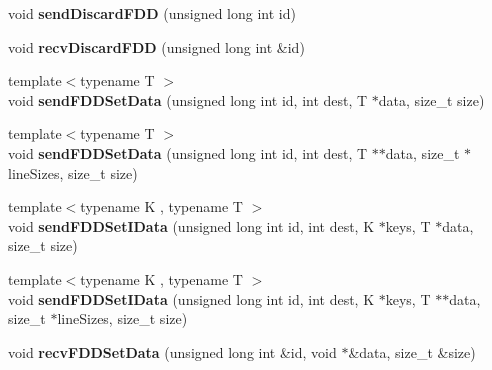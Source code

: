 \begin{DoxyCompactItemize}
\item 
\hypertarget{classfaster_1_1fastComm_a7e1ca7788c4310cb84640812fa50a012}{}void {\bfseries send\+Discard\+F\+D\+D} (unsigned long int id)\label{classfaster_1_1fastComm_a7e1ca7788c4310cb84640812fa50a012}

\item 
\hypertarget{classfaster_1_1fastComm_aaa0a11dcde70a8dcf39b0773c9c15d43}{}void {\bfseries recv\+Discard\+F\+D\+D} (unsigned long int \&id)\label{classfaster_1_1fastComm_aaa0a11dcde70a8dcf39b0773c9c15d43}

\item 
\hypertarget{classfaster_1_1fastComm_acc7534571a62d6df7c4f7a13d69b9e41}{}{\footnotesize template$<$typename T $>$ }\\void {\bfseries send\+F\+D\+D\+Set\+Data} (unsigned long int id, int dest, T $\ast$data, size\+\_\+t size)\label{classfaster_1_1fastComm_acc7534571a62d6df7c4f7a13d69b9e41}

\item 
\hypertarget{classfaster_1_1fastComm_a71e3ddff08c78a0a0e4cfb03f3ebf63c}{}{\footnotesize template$<$typename T $>$ }\\void {\bfseries send\+F\+D\+D\+Set\+Data} (unsigned long int id, int dest, T $\ast$$\ast$data, size\+\_\+t $\ast$line\+Sizes, size\+\_\+t size)\label{classfaster_1_1fastComm_a71e3ddff08c78a0a0e4cfb03f3ebf63c}

\item 
\hypertarget{classfaster_1_1fastComm_aeaf4e75975319f16c3c9544b8ab9309e}{}{\footnotesize template$<$typename K , typename T $>$ }\\void {\bfseries send\+F\+D\+D\+Set\+I\+Data} (unsigned long int id, int dest, K $\ast$keys, T $\ast$data, size\+\_\+t size)\label{classfaster_1_1fastComm_aeaf4e75975319f16c3c9544b8ab9309e}

\item 
\hypertarget{classfaster_1_1fastComm_aa1937f0dfe57c88c95c3c03596df3298}{}{\footnotesize template$<$typename K , typename T $>$ }\\void {\bfseries send\+F\+D\+D\+Set\+I\+Data} (unsigned long int id, int dest, K $\ast$keys, T $\ast$$\ast$data, size\+\_\+t $\ast$line\+Sizes, size\+\_\+t size)\label{classfaster_1_1fastComm_aa1937f0dfe57c88c95c3c03596df3298}

\item 
\hypertarget{classfaster_1_1fastComm_aa370d793025cbed0d74391a8e6dccf46}{}void {\bfseries recv\+F\+D\+D\+Set\+Data} (unsigned long int \&id, void $\ast$\&data, size\+\_\+t \&size)\label{classfaster_1_1fastComm_aa370d793025cbed0d74391a8e6dccf46}


\end{DoxyCompactItemize}
